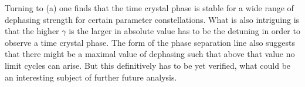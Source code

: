 \begin{appendices}
    Turning to (a) one finds that the time crystal phase is stable for a wide range of dephasing strength for certain parameter constellations. What is also intriguing is that the higher $\gamma$ is the larger in absolute value has to be the detuning in order to observe a time crystal phase. The form of the phase separation line also suggests that there might be a maximal value of dephasing such that above that value no limit cycles can arise. But this definitively has to be yet verified, what could be an interesting subject of further future analysis.




\end{appendices}